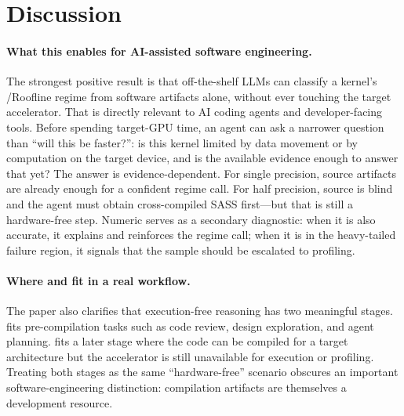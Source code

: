 \section{Discussion}
\label{sec:discussion}

\paragraph{What this enables for AI-assisted software engineering.}
The strongest positive result is that off-the-shelf LLMs can classify a kernel's \bandwidthbound/\computebound Roofline regime from software artifacts alone, without ever touching the target accelerator.
That is directly relevant to AI coding agents and developer-facing tools.
Before spending target-GPU time, an agent can ask a narrower question than ``will this be faster?'':
is this kernel limited by data movement or by computation on the target device, and is the available evidence enough to answer that yet?
The answer is evidence-dependent.
For single precision, source artifacts are already enough for a confident regime call.
For half precision, source is blind and the agent must obtain cross-compiled SASS first---but that is still a hardware-free step.
Numeric \rai serves as a secondary diagnostic: when it is also accurate, it explains and reinforces the regime call; when it is in the heavy-tailed failure region, it signals that the sample should be escalated to profiling.

\paragraph{Where \sourceonly and \sourcesass fit in a real workflow.}
The paper also clarifies that execution-free reasoning has two meaningful stages.
\sourceonly fits pre-compilation tasks such as code review, design exploration, and agent planning.
\sourcesass fits a later stage where the code can be compiled for a target architecture but the accelerator is still unavailable for execution or profiling.
Treating both stages as the same ``hardware-free'' scenario obscures an important software-engineering distinction: compilation artifacts are themselves a development resource.


